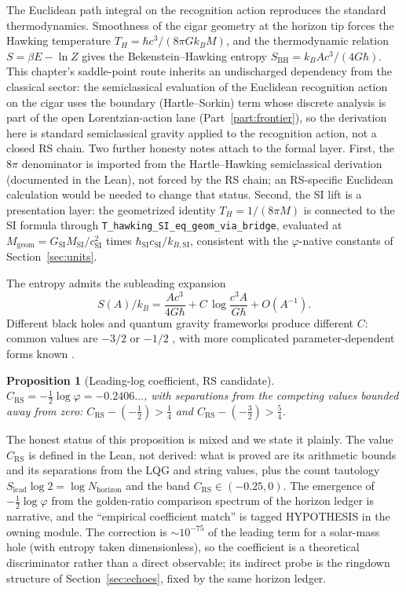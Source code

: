 \documentclass[11pt,letterpaper]{article}
\newtheorem{proposition}[theorem]{Proposition}
\newcommand{\lean}[1]{\texttt{#1}}
\begin{document}
The Euclidean path integral on the recognition action reproduces the standard thermodynamics. Smoothness of the cigar geometry at the horizon tip forces the Hawking temperature $T_{H}=\hbar c^{3}/(8\pi G k_{B}M)$, and the thermodynamic relation $S=\beta E-\ln Z$ gives the Bekenstein--Hawking entropy $S_{\mathrm{BH}}=k_{B}Ac^{3}/(4G\hbar)$. This chapter's saddle-point route inherits an undischarged dependency from the classical sector: the semiclassical evaluation of the Euclidean recognition action on the cigar uses the boundary (Hartle--Sorkin) term whose discrete analysis is part of the open Lorentzian-action lane (Part~\ref{part:frontier}), so the derivation here is standard semiclassical gravity applied to the recognition action, not a closed RS chain. Two further honesty notes attach to the formal layer. First, the $8\pi$ denominator is imported from the Hartle--Hawking semiclassical derivation (documented in the Lean), not forced by the RS chain; an RS-specific Euclidean calculation would be needed to change that status. Second, the SI lift is a presentation layer: the geometrized identity $T_{H}=1/(8\pi M)$ is connected to the SI formula through \lean{T\_hawking\_SI\_eq\_geom\_via\_bridge}, evaluated at $M_{\mathrm{geom}}=G_{\mathrm{SI}}M_{\mathrm{SI}}/c_{\mathrm{SI}}^{2}$ times $\hbar_{\mathrm{SI}}c_{\mathrm{SI}}/k_{B,\mathrm{SI}}$, consistent with the $\varphi$-native constants of Section~\ref{sec:units}.

The entropy admits the subleading expansion
\begin{equation}
S(A)/k_{B}=\frac{Ac^{3}}{4G\hbar}+C\,\log\frac{c^{3}A}{G\hbar}+O(A^{-1}).
\label{eq:logcorr}
\end{equation}
Different black holes and quantum gravity frameworks produce different $C$: common values are $-3/2$ \cite{KaulMajumdar,Carlip,Gour} or $-1/2$ \cite{JingYan,MukherjiPal,GhoshMitra}, with more complicated parameter-dependent forms known \cite{Sen}.

\begin{proposition}[Leading-log coefficient, RS candidate]
\label{prop:leadinglog}
$C_{\mathrm{RS}}=-\tfrac12\log\varphi=-0.2406\ldots$, with separations from the competing values bounded away from zero: $C_{\mathrm{RS}}-(-\tfrac12)>\tfrac14$ and $C_{\mathrm{RS}}-(-\tfrac32)>\tfrac54$.
\end{proposition}

The honest status of this proposition is mixed and we state it plainly. The value $C_{\mathrm{RS}}$ is defined in the Lean, not derived: what is proved are its arithmetic bounds and its separations from the LQG and string values, plus the count tautology $S_{\mathrm{lead}}\log 2=\log N_{\mathrm{horizon}}$ and the band $C_{\mathrm{RS}}\in(-0.25,0)$. The emergence of $-\tfrac12\log\varphi$ from the golden-ratio comparison spectrum of the horizon ledger is narrative, and the ``empirical coefficient match'' is tagged HYPOTHESIS in the owning module. The correction is $\sim10^{-75}$ of the leading term for a solar-mass hole (with entropy taken dimensionless), so the coefficient is a theoretical discriminator rather than a direct observable; its indirect probe is the ringdown structure of Section~\ref{sec:echoes}, fixed by the same horizon ledger.
\end{document}
